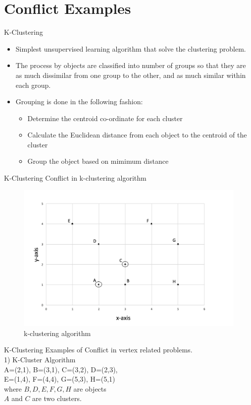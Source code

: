 \section{Conflict Examples}
\begin{frame}{K-Clustering}
  \begin{itemize}
    \item Simplest unsupervised learning algorithm that solve the clustering problem.
    \item The process by objects are classified into number of groups so that they are as much dissimilar from one group to the other,
          and as much similar within each group.
    \item Grouping is done in the following fashion:
          \begin{itemize}
            \item Determine the centroid co-ordinate for each cluster
            \item Calculate the Euclidean distance from each object to the centroid of the cluster
            \item Group the object based on mimimum distance
          \end{itemize}
  \end{itemize}
\end{frame}

\begin{frame}{K-Clustering}
	Conflict in k-clustering algorithm
			\begin{figure}
			\includegraphics[width=0.8\linewidth]{figures/k-cluster.jpg}
			\caption{k-clustering algorithm}
			\end{figure}
\end{frame}

\begin{frame}{K-Clustering}
  Examples of Conflict in vertex related problems.\\
  1) K-Cluster Algorithm\\
  A=(2,1), B=(3,1), C=(3,2), D=(2,3),\\
  E=(1,4), F=(4,4), G=(5,3), H=(5,1)\\ where $B, D, E, F, G, H$ are objects\\
  $A$ and $C$ are two clusters.\\
\end{frame}

